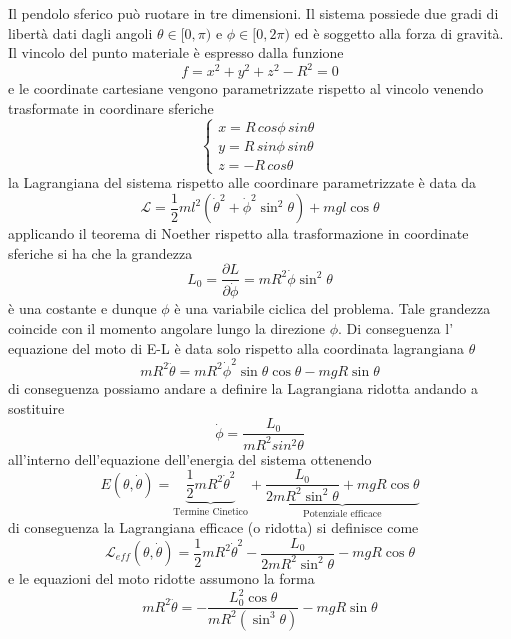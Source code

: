 Il pendolo sferico pu\`{o} ruotare in tre dimensioni. Il sistema possiede due gradi di libert\`{a} dati dagli angoli $\theta \in [0,\pi)$ e $\phi \in [0,2\pi)$ ed \`{e} soggetto alla forza di gravit\`{a}. Il vincolo del punto materiale \`{e} espresso dalla funzione 
\begin{equation*}
	f = x^2+y^2+z^2 -R^2 = 0
\end{equation*}
e le coordinate cartesiane vengono parametrizzate rispetto al vincolo venendo trasformate in coordinare sferiche 
\begin{equation*}
	\left \{ \begin{array}{l}
		x = R \, cos\phi \, sin\theta \\
		y =R \, sin\phi \, sin \theta \\
		z = -R \, cos \theta
	\end{array} \right.
\end{equation*}
la Lagrangiana del sistema rispetto alle coordinare parametrizzate \`{e} data da 
\begin{equation*}
	\mathcal{L} = \frac{1}{2} m l^2\left(\dot{\theta}^2+\dot{\phi}^2 \sin ^2 \theta\right)+m g l \cos \theta
\end{equation*}
applicando il teorema di Noether rispetto alla trasformazione in coordinate sferiche si ha che la grandezza 
\begin{equation}
	L_0=\frac{\partial L}{\partial \dot{\phi}}=m R^2 \dot{\phi} \sin ^2 \theta
\end{equation}
\`{e} una costante e dunque $\phi$ \`{e} una variabile ciclica del problema. Tale grandezza coincide con il momento angolare lungo la direzione $\phi$. Di conseguenza l' equazione del moto di E-L \`{e} data solo rispetto alla coordinata lagrangiana $\theta$
\begin{equation}
m R^2 \ddot{\theta}=m R^2 \dot{\phi}^2 \sin \theta \cos \theta-m g R \sin \theta
\end{equation}
di conseguenza possiamo andare a definire la Lagrangiana ridotta andando a sostituire
\begin{equation*}
	\dot{\phi} = \frac{L_0}{mR^2sin^2\theta}
\end{equation*}
all'interno dell'equazione dell'energia del sistema ottenendo
\begin{equation}
E(\theta,\dot{\theta})=\underbrace{\frac{1}{2} m R^2 \dot{\theta}^2}_{\text{Termine Cinetico}}+ \underbrace{\frac{L_0}{2 m R^2 \sin ^2 \theta}+m g R \cos \theta}_{\text{Potenziale efficace}}
\end{equation}
di conseguenza la Lagrangiana efficace (o ridotta) si definisce come 
\begin{equation}
	\mathcal{L}_{eff}(\theta ,\dot{\theta}) = \frac{1}{2} m R^2 \dot{\theta}^2 - \frac{L_0}{2 m R^2 \sin ^2 \theta}-m g R \cos \theta
\end{equation}
e le equazioni del moto ridotte assumono la forma \begin{equation}
m R^2 \ddot{\theta}=-\frac{L_0^2 \cos \theta}{m R^2\left(\sin ^3 \theta\right)}-m g R \sin \theta
\end{equation}

